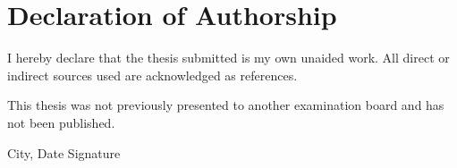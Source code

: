 \chapter*{Declaration of Authorship}
\thispagestyle{empty}

I hereby declare that the thesis submitted is my own unaided work. All direct or indirect sources used are acknowledged as references.

\vspace{.5\baselineskip}
This thesis was not previously presented to another examination board and has not been published.

\vspace{4\baselineskip}
\begin{center}
\parbox{.8\textwidth}{City, Date \hfill Signature}
\end{center}

\endinput
